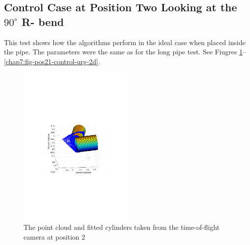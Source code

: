 \subsection{Control Case at Position Two Looking at the $90^\circ$ R- bend}
This test shows how the algorithms perform in the ideal case when placed inside the
pipe. The parameters were the same as for the long pipe test. See Fiugres
\ref{chap7:fig-pos21-control-tof-3d}--\ref{chap7:fig-pos21-control-urg-2d}.
\begin{figure}[htbp]
    \centering
    \includegraphics[width=0.5\textwidth]{pics/pos21-control-tof-3d}
    \caption{The point cloud and fitted cylinders taken from the time-of-flight camera at
    position 2}
    \label{chap7:fig-pos21-control-tof-3d}
\end{figure}
